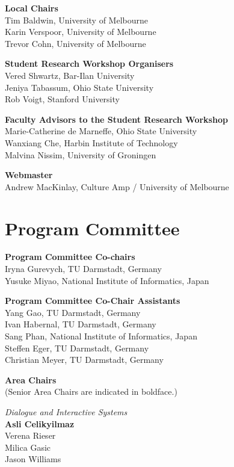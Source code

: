 {\bf Local Chairs} \\
Tim Baldwin, University of Melbourne\\
Karin Verspoor, University of Melbourne\\
Trevor Cohn, University of Melbourne

{\bf Student Research Workshop Organisers} \\
Vered Shwartz, Bar-Ilan University\\
Jeniya Tabassum, Ohio State University\\
Rob Voigt, Stanford University

{\bf Faculty Advisors to the Student Research Workshop} \\
Marie-Catherine de Marneffe, Ohio State University\\
Wanxiang Che, Harbin Institute of Technology\\
Malvina Nissim, University of Groningen

{\bf Webmaster} \\
Andrew MacKinlay, Culture Amp / University of Melbourne


\clearpage
\section{Program Committee}
\setlength{\parindent}{0pt}

{\bf Program Committee Co-chairs} \\
Iryna Gurevych, TU Darmstadt, Germany \\
Yusuke Miyao, National Institute of Informatics, Japan

{\bf Program Committee Co-Chair Assistants} \\
Yang Gao, TU Darmstadt, Germany \\
Ivan Habernal, TU Darmstadt, Germany \\
Sang Phan, National Institute of Informatics, Japan \\
Steffen Eger, TU Darmstadt, Germany \\
Christian Meyer, TU Darmstadt, Germany

{\bf Area Chairs} \\
(Senior Area Chairs are indicated in boldface.)

\emph{Dialogue and Interactive Systems} \\
\hspace*{5mm}\textbf{Asli Celikyilmaz} \\
\hspace*{5mm}Verena Rieser \\
\hspace*{5mm}Milica Gasic \\
\hspace*{5mm}Jason Williams

